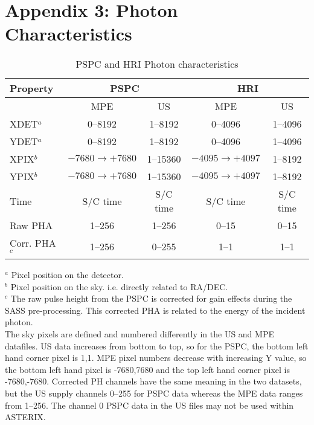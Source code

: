 \documentclass[11pt,fleqn]{article}    %
\begin{document}
\newpage
\section{Appendix 3: Photon Characteristics}
\begin {table}[h]
\caption{PSPC and HRI Photon characteristics}
\label{t:phot}
\begin{center}
\begin{tabular}{|l|c|c|c|c|}
\hline
Property        &\multicolumn{2}{|c}{PSPC} & \multicolumn{2}{c|}{HRI}  \\ \hline
                &  MPE      &  US          &  MPE   &  US  \\ \hline
XDET$^{a}$      &  0--8192  &  1--8192  &  0--4096 & 1--4096 \\
YDET$^{a}$      &  0--8192  &  1--8192 & 0--4096   & 1--4096 \\
XPIX$^{b}$      & $-7680\rightarrow+7680$ &  1--15360 & $-4095\rightarrow+4097$ & 1--8192 \\
YPIX$^{b}$      & $-7680\rightarrow+7680$ &  1--15360 & $-4095\rightarrow+4097$ & 1--8192 \\
Time            &   S/C time &  S/C time  &  S/C time  & S/C time \\
Raw PHA         & 1--256     &  1--256 & 0--15 & 0--15 \\
Corr. PHA$^{c}$ & 1--256     &  0--255 & 1--1  & 1--1 \\
\hline
\end{tabular}
\end{center}
$^{a}$ Pixel position on the detector. \\
$^{b}$ Pixel position on the sky. i.e. directly related to RA/DEC. \\
$^{c}$ The raw pulse height from the PSPC is corrected for
gain effects during the SASS pre-processing. This corrected PHA is 
related to the energy of the incident photon. \\

The sky pixels are defined and numbered differently in the US and MPE datafiles.
US data increases from bottom to top, so for the PSPC, the 
bottom left hand corner 
pixel is 1,1. MPE pixel numbers decrease with increasing Y value, so
the bottom left hand pixel is -7680,7680 and the top left hand corner
pixel is -7680,-7680. Corrected PH channels have the same meaning in
the two datasets, but the US supply channels 0--255 for PSPC data 
whereas the MPE
data ranges from 1--256. The channel 0 PSPC data in the US files 
may not be used within ASTERIX.

\end{table}
\end{document}
